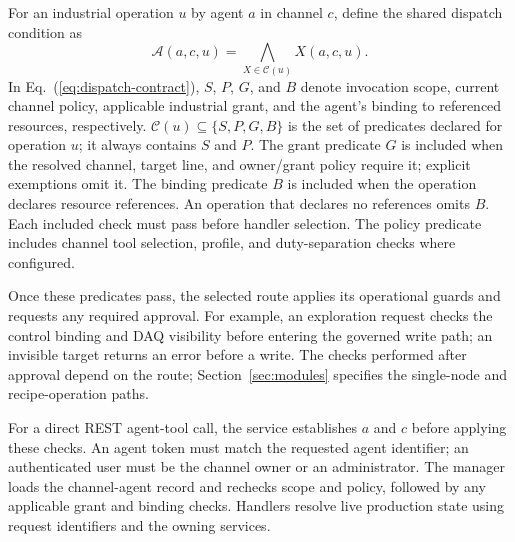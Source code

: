 For an industrial operation $u$ by agent $a$ in channel $c$, define the
shared dispatch condition as
\begin{equation}
\mathcal{A}(a,c,u)=\bigwedge_{X\in\mathcal{C}(u)}X(a,c,u).
\label{eq:dispatch-contract}
\end{equation}
In Eq.~(\ref{eq:dispatch-contract}), $S$, $P$, $G$, and $B$ denote invocation scope, current channel policy,
applicable industrial grant, and the agent's binding to referenced resources,
respectively. $\mathcal{C}(u)\subseteq\{S,P,G,B\}$ is the set of predicates
declared for operation $u$; it always contains $S$ and $P$. The grant predicate
$G$ is included when the resolved channel, target line, and owner/grant policy
require it; explicit exemptions omit it. The binding predicate $B$ is included
when the operation declares resource references. An operation that declares
no references omits $B$. Each included check must pass before handler
selection. The policy predicate includes channel tool selection, profile, and duty-separation checks where
configured.

Once these predicates pass, the selected route applies its operational
guards and requests any required approval. For example, an exploration request checks
the control binding and DAQ visibility before entering the governed write
path; an invisible target returns an error before a write. The checks performed
after approval depend on the route; Section~\ref{sec:modules} specifies the
single-node and recipe-operation paths.

For a direct REST agent-tool call, the service establishes $a$ and $c$ before applying
these checks. An agent token must match the requested agent identifier; an
authenticated user must be the channel owner or an administrator. The manager
loads the channel-agent record and rechecks scope and policy, followed by any
applicable grant and binding checks. Handlers resolve live production state
using request identifiers and the owning services.



